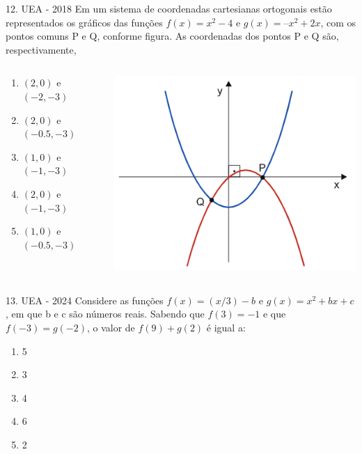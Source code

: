 \documentclass[11pt]{beamer}
\begin{document}
\begin{frame}{12. UEA - 2018}
    Em um sistema de coordenadas cartesianas ortogonais estão representados os gráficos das funções $f(x) = x^{2}-4$ e $g(x) = –x^{2}+2x$, com os pontos comuns P e Q, conforme figura. As coordenadas dos pontos P e Q são, respectivamente,

    \begin{columns}
        \begin{column}{0.4\textwidth}
            \begin{enumerate}[a]
                \item $(2,0)$ e $(-2,-3)$  
                \item $(2,0)$ e $(-0.5,-3)$
                \item $(1,0)$ e $(-1,-3)$ 
                \item $(2,0)$ e $(-1,-3)$ %
                \item $(1,0)$ e $(-0.5,-3)$
            \end{enumerate}
        \end{column}

        \begin{column}{0.5\textwidth}
            \centering
            \includegraphics[width=0.8\linewidth]{imagens/uea-macro-2018.png}
        \end{column}
    \end{columns}
    
\end{frame}

\begin{frame}{13. UEA - 2024}
    Considere as funções $f(x)=({x}/{3})-b$ e $g(x)=x^{2}+bx+c$, em que b e c são números reais. Sabendo que $f(3)=-1$ e que $f(-3)=g(-2)$, o valor de $f(9)+g(2)$ é igual a:

    \begin{enumerate}[a]
        \item 5
        \item 3
        \item 4
        \item 6 %
        \item 2
    \end{enumerate}
\end{frame}
\end{document}
